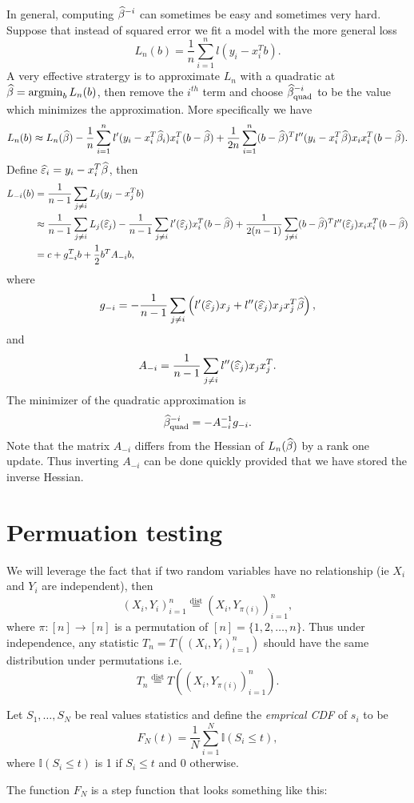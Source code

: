 In general, computing $\widehat{\beta}^{-i}$ can sometimes be easy and sometimes very hard. Suppose that instead of squared error we fit a model with the more general loss 
\[L_n(b) = \frac{1}{n}\sum_{i=1}^n l(y_i-x_i^Tb).\]
A very effective stratergy is to approximate $L_n$ with a quadratic at $\widehat{\beta} =\operatorname*{argmin}_b L_n(b)$, then remove the $i^{th}$ term and choose $\widehat{\beta}^{-i}_{\text{quad}}$ to be the value which minimizes the approximation. More specifically we have
\[L_n(b) \approx L_n(\widehat{\beta}) -\frac{1}{n}\sum_{i=1}^n l'(y_i-x_i^T\widehat{\beta}_i)x_i^T(b-\widehat{\beta})+\frac{1}{2n}\sum_{i=1}^n (b-\widehat{\beta})^Tl''(y_i-x_i^T\widehat{\beta})x_ix_i^T(b-\widehat{\beta}).\] 
Define $\widehat{\varepsilon}_i = y_i-x_i^T\widehat{\beta}$, then 
\begin{align*}
    L_{-i}(b) &= \frac{1}{n-1}\sum_{j \neq i}L_j(y_j-x_j^Tb)\\
    &\approx \frac{1}{n-1}\sum_{j \neq i}L_j(\widehat{\varepsilon}_j)-\frac{1}{n-1}\sum_{j \neq i}l'(\widehat{\varepsilon}_j)x_i^T(b-\widehat{\beta})+\frac{1}{2(n-1)}\sum_{j \neq i}(b-\widehat{\beta})^Tl''(\widehat{\varepsilon}_j)x_ix_i^T(b-\widehat{\beta})\\
    &= c+g_{-i}^T b + \frac{1}{2}b^TA_{-i}b,
\end{align*}
where
\[g_{-i} = -\frac{1}{n-1}\sum_{j\neq i}\left(l'(\widehat{\varepsilon}_j)x_j+l''(\widehat{\varepsilon}_j)x_jx_j^T\widehat{\beta}\right),\]
and
\[A_{-i} = \frac{1}{n-1}\sum_{j\neq i} l''(\widehat{\varepsilon}_j)x_jx_j^T. \]
The minimizer of the quadratic approximation is
\[ \widehat{\beta}^{-i}_{\text{quad}} = -A^{-1}_{-i}g_{-i}.\]
Note that the matrix $A_{-i}$ differs from the Hessian of $L_n(\widehat{\beta})$ by a rank one update. Thus inverting $A_{-i}$ can be done quickly provided that we have stored the inverse Hessian. 
\section{Permuation testing}
We will leverage the fact that if two random variables have no relationship (ie $X_i$ and $Y_i$ are independent), then 
\[(X_i,Y_i)_{i=1}^n \stackrel{\text{dist}}{=} (X_i, Y_{\pi(i)})_{i=1}^n, \]
where $\pi : [n] \to [n]$ is a permutation of $[n]=\{1,2,\ldots,n\}$. Thus under independence, any statistic $T_n = T((X_i,Y_i)_{i=1}^n)$ should have the same distribution under permutations i.e.
\[T_n  \stackrel{\text{dist}}{=}  T((X_i,Y_{\pi(i)})_{i=1}^n).\]
\begin{defn}
    Let $S_1,\ldots, S_N$ be real values statistics and define the \emph{emprical CDF} of $s_i$ to be
    \[F_N(t) = \frac{1}{N}\sum_{i=1}^N \mathbb{I}(S_i \le t), \]
    where $\mathbb{I}(S_i \le t)$ is 1 if $S_i \le t$ and 0 otherwise. 
\end{defn}
The function $F_N$ is a step function that looks something like this:

